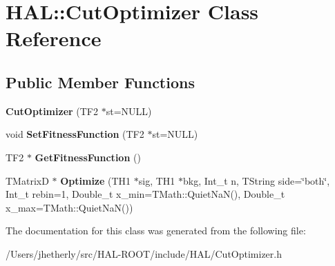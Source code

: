 \hypertarget{class_h_a_l_1_1_cut_optimizer}{\section{H\+A\+L\+:\+:Cut\+Optimizer Class Reference}
\label{class_h_a_l_1_1_cut_optimizer}
}
\subsection*{Public Member Functions}
\begin{DoxyCompactItemize}
\item 
\hypertarget{class_h_a_l_1_1_cut_optimizer_a7f1be065a4ec07a1e8cfee59dc0b80d1}{{\bfseries Cut\+Optimizer} (T\+F2 $\ast$st=N\+U\+L\+L)}\label{class_h_a_l_1_1_cut_optimizer_a7f1be065a4ec07a1e8cfee59dc0b80d1}

\item 
\hypertarget{class_h_a_l_1_1_cut_optimizer_a89082c3ec2719462ba90b3677119a1c6}{void {\bfseries Set\+Fitness\+Function} (T\+F2 $\ast$st=N\+U\+L\+L)}\label{class_h_a_l_1_1_cut_optimizer_a89082c3ec2719462ba90b3677119a1c6}

\item 
\hypertarget{class_h_a_l_1_1_cut_optimizer_a35eab754a13b06da0526fdf9900cc6eb}{T\+F2 $\ast$ {\bfseries Get\+Fitness\+Function} ()}\label{class_h_a_l_1_1_cut_optimizer_a35eab754a13b06da0526fdf9900cc6eb}

\item 
\hypertarget{class_h_a_l_1_1_cut_optimizer_a7055834b45ab96cbe30d335f7cd6f26d}{T\+Matrix\+D $\ast$ {\bfseries Optimize} (T\+H1 $\ast$sig, T\+H1 $\ast$bkg, Int\+\_\+t n, T\+String side=\char`\"{}both\char`\"{}, Int\+\_\+t rebin=1, Double\+\_\+t x\+\_\+min=T\+Math\+::\+Quiet\+Na\+N(), Double\+\_\+t x\+\_\+max=T\+Math\+::\+Quiet\+Na\+N())}\label{class_h_a_l_1_1_cut_optimizer_a7055834b45ab96cbe30d335f7cd6f26d}

\end{DoxyCompactItemize}


The documentation for this class was generated from the following file\+:\begin{DoxyCompactItemize}
\item 
/\+Users/jhetherly/src/\+H\+A\+L-\/\+R\+O\+O\+T/include/\+H\+A\+L/Cut\+Optimizer.\+h\end{DoxyCompactItemize}
